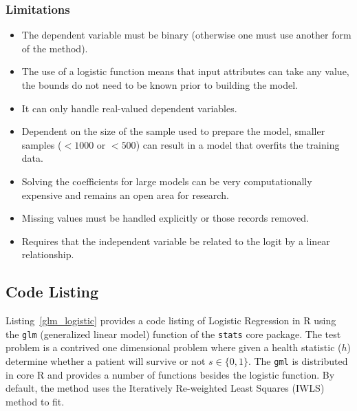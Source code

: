 \subsubsection{Limitations}

\begin{itemize}
	\item The dependent variable must be binary (otherwise one must use another form of the method).
	\item The use of a logistic function means that input attributes can take any value, the bounds do not need to be known prior to building the model.
	\item It can only handle real-valued dependent variables.
	\item Dependent on the size of the sample used to prepare the model, smaller samples ($<1000$ or $<500$) can result in a model that overfits the training data.
	\item Solving the coefficients for large models can be very computationally expensive and remains an open area for research.
	\item Missing values must be handled explicitly or those records removed.
	\item Requires that the independent variable be related to the logit by a linear relationship.
\end{itemize}


\subsection{Code Listing}
Listing~\ref{glm_logistic} provides a code listing of Logistic Regression in R using the \texttt{glm} (generalized linear model) function of the \texttt{stats} core package. 
The test problem is a contrived one dimensional problem where given a health statistic ($h$) determine whether a patient will survive or not $s\in\{0,1\}$.
The \texttt{gml} is distributed in core R and provides a number of functions besides the logistic function. By default, the method uses the Iteratively Re-weighted Least Squares (IWLS) method to fit.




